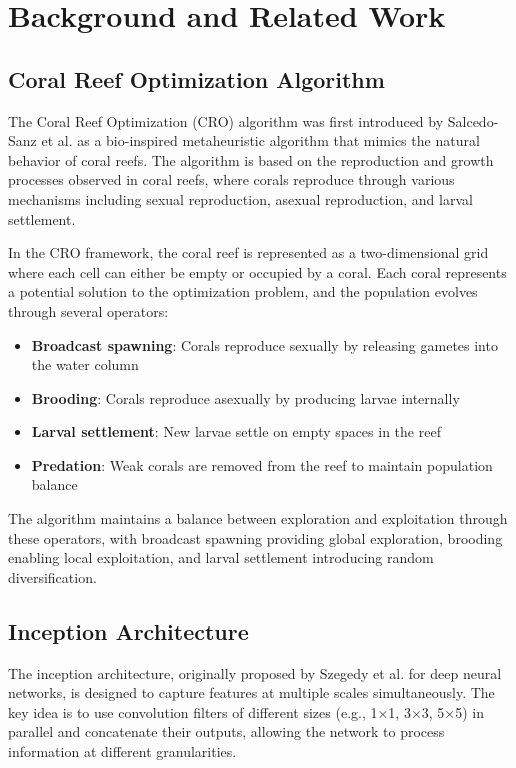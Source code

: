 \section{Background and Related Work}
\label{sec:background}

\subsection{Coral Reef Optimization Algorithm}

The Coral Reef Optimization (CRO) algorithm was first introduced by Salcedo-Sanz et al. \cite{salcedo2014coral} as a bio-inspired metaheuristic algorithm that mimics the natural behavior of coral reefs. The algorithm is based on the reproduction and growth processes observed in coral reefs, where corals reproduce through various mechanisms including sexual reproduction, asexual reproduction, and larval settlement.

In the CRO framework, the coral reef is represented as a two-dimensional grid where each cell can either be empty or occupied by a coral. Each coral represents a potential solution to the optimization problem, and the population evolves through several operators:

\begin{itemize}
    \item \textbf{Broadcast spawning}: Corals reproduce sexually by releasing gametes into the water column
    \item \textbf{Brooding}: Corals reproduce asexually by producing larvae internally
    \item \textbf{Larval settlement}: New larvae settle on empty spaces in the reef
    \item \textbf{Predation}: Weak corals are removed from the reef to maintain population balance
\end{itemize}

The algorithm maintains a balance between exploration and exploitation through these operators, with broadcast spawning providing global exploration, brooding enabling local exploitation, and larval settlement introducing random diversification.

\subsection{Inception Architecture}

The inception architecture, originally proposed by Szegedy et al. \cite{szegedy2015going} for deep neural networks, is designed to capture features at multiple scales simultaneously. The key idea is to use convolution filters of different sizes (e.g., 1×1, 3×3, 5×5) in parallel and concatenate their outputs, allowing the network to process information at different granularities.

